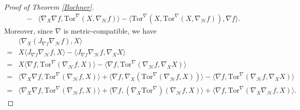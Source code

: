 \documentclass[10pt,a4paper]{amsart}
\newcommand{\Tor}{\mathrm{Tor}}
\begin{document}
\begin{proof}[Proof of Theorem \ref{Bochner}]
\begin{align*}
			-&\langle \nabla_X\nabla f , \Tor^\nabla(X, \nabla_{\mathcal{H}}f) \rangle-\langle \Tor^\nabla(X, \Tor^{\nabla}(X, \nabla_\mathcal{H}f) ), \nabla f \rangle.
		\end{align*}
		Moreover, since $\nabla$ is metric-compatible, we have
		\begin{align*}
			&\langle \nabla_X (J_{\nabla f}\nabla_\mathcal{H}f), X \rangle\\
			=&X\langle J_{\nabla f}\nabla_\mathcal{H}f, X \rangle-\langle J_{\nabla f}\nabla_\mathcal{H}f, \nabla_X X \rangle  \\
			=&X\langle \nabla f, \Tor^\nabla(\nabla_\mathcal{H}f, X) \rangle-\langle   \nabla f, \Tor^\nabla(\nabla_{\mathcal{H}}f, \nabla_X X)\rangle\\
			=&\langle \nabla_X \nabla f, \Tor^\nabla(\nabla_{\mathcal{H}}f, X) \rangle+\langle \nabla f, \nabla_X (\Tor^\nabla(\nabla_{\mathcal{H}}f, X)) \rangle-\langle \nabla f,  \Tor^\nabla(\nabla_{\mathcal{H}}f, \nabla_X X) \rangle \\
			=&\langle \nabla_X \nabla f, \Tor^\nabla(\nabla_{\mathcal{H}}f, X) \rangle+\langle \nabla f, (\nabla_X \Tor^\nabla)(\nabla_{\mathcal{H}}f, X) \rangle+\langle \nabla f,  \Tor^\nabla(\nabla_X \nabla_{\mathcal{H}}f,  X) \rangle.
		\end{align*}
		

\end{proof}
\end{document}
